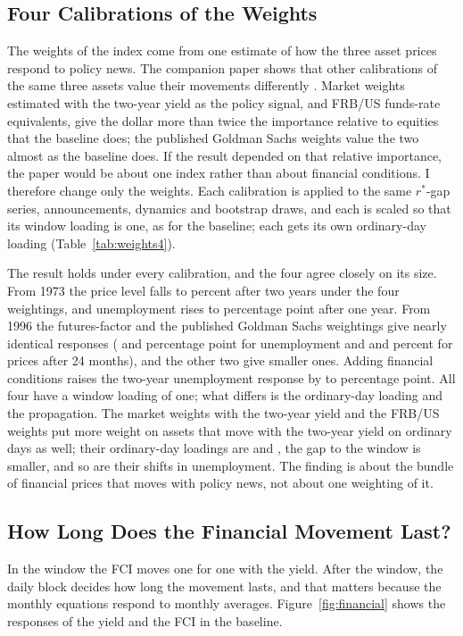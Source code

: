 \documentclass[11pt]{article}
\newcommand{\rs}{r^{*}}
\begin{document}
\subsection{Four Calibrations of the Weights}\label{sec:weights4}
The weights of the index come from one estimate of how the three asset prices respond to policy news. The companion paper shows that other calibrations of the same three assets value their movements differently \citep{fcinote}. Market weights estimated with the two-year yield as the policy signal, and FRB/US funds-rate equivalents, give the dollar more than twice the importance relative to equities that the baseline does; the published Goldman Sachs weights value the two almost as the baseline does. If the result depended on that relative importance, the paper would be about one index rather than about financial conditions. I therefore change only the weights. Each calibration is applied to the same $\rs$-gap series, announcements, dynamics and bootstrap draws, and each is scaled so that its window loading is one, as for the baseline; each gets its own ordinary-day loading (Table~\ref{tab:weights4}).



The result holds under every calibration, and the four agree closely on its size. From 1973 the price level falls  to  percent after two years under the four weightings, and unemployment rises  to  percentage point after one year. From 1996 the futures-factor and the published Goldman Sachs weightings give nearly identical responses ( and  percentage point for unemployment and  and  percent for prices after 24 months), and the other two give smaller ones. Adding financial conditions raises the two-year unemployment response by  to  percentage point. All four have a window loading of one; what differs is the ordinary-day loading and the propagation. The market weights with the two-year yield and the FRB/US weights put more weight on assets that move with the two-year yield on ordinary days as well; their ordinary-day loadings are  and , the gap to the window is smaller, and so are their shifts in unemployment. The finding is about the bundle of financial prices that moves with policy news, not about one weighting of it.

\subsection{How Long Does the Financial Movement Last?}\label{sec:resolve}
In the window the FCI moves one for one with the yield. After the window, the daily block decides how long the movement lasts, and that matters because the monthly equations respond to monthly averages. Figure~\ref{fig:financial} shows the responses of the yield and the FCI in the baseline.
\end{document}
